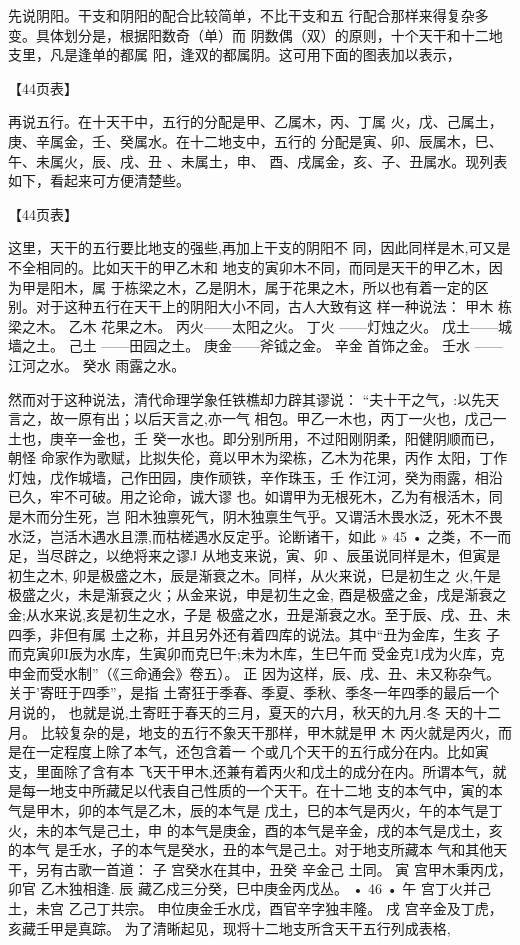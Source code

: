 先说阴阳。干支和阴阳的配合比较简单，不比干支和五
行配合那样来得复杂多变。具体划分是，根据阳数奇（单）而
阴数偶（双）的原则，十个天干和十二地支里，凡是逢单的都属
阳，逢双的都属阴。这可用下面的图表加以表示，

【44页表】

再说五行。在十天干中，五行的分配是甲、乙属木，丙、丁属
火，戊、己属土，庚、辛属金，壬、癸属水。在十二地支中，五行的
分配是寅、卯、辰属木，巳、午、未属火，辰、戌、丑 、未属土，申、
酉、戌属金，亥、子、丑属水。现列表如下，看起来可方便清楚些。

【44页表】

这里，天干的五行要比地支的强些,再加上干支的阴阳不
同，因此同样是木,可又是不全相同的。比如天干的甲乙木和
地支的寅卯木不同，而同是天干的甲乙木，因为甲是阳木，属
于栋梁之木，乙是阴木，属于花果之木，所以也有着一定的区
别。对于这种五行在天干上的阴阳大小不同，古人大致有这
样一种说法：
甲木 栋梁之木。
乙木 花果之木。
丙火——太阳之火。
丁火
——灯烛之火。
戊土——城墙之土。
己土
——田园之土。
庚金——斧钺之金。
辛金 首饰之金。
壬水
——江河之水。
癸水 雨露之水。

然而对于这种说法，清代命理学象任铁樵却力辟其谬说：
“夫十干之气，:以先天言之，故一原有出；以后天言之,亦一气
相包。甲乙一木也，丙丁一火也，戊己一土也，庚辛一金也，壬
癸一水也。即分别所用，不过阳刚阴柔，阳健阴顺而已，朝怪
命家作为歌赋，比拟失伦，竟以甲木为梁栋，乙木为花果，丙作
太阳，丁作灯烛，戊作城墙，己作田园，庚作顽铁，辛作珠玉，壬
作江河，癸为雨露，相沿已久，牢不可破。用之论命，诚大谬
也。如谓甲为无根死木，乙为有根活木，同是木而分生死，岂
阳木独禀死气，阴木独禀生气乎。又谓活木畏水泛，死木不畏
水泛，岂活木遇水且漂,而枯槎遇水反定乎。论断诸干，如此
» 45 •
之类，不一而足，当尽辟之，以绝将来之谬J
从地支来说，寅、卯 、辰虽说同样是木，但寅是初生之木,
卯是极盛之木，辰是渐衰之木。同样，从火来说，巳是初生之
火,午是极盛之火，未是渐衰之火；从金来说，申是初生之金,
酉是极盛之金，戌是渐衰之金;从水来说,亥是初生之水，子是
极盛之水，丑是渐衰之水。至于辰、戌、丑、未四季，非但有属
土之称，并且另外还有着四库的说法。其中“丑为金库，生亥
子而克寅卯I辰为水库，生寅卯而克巳午;未为木库，生巳午而
受金克1戌为火库，克申金而受水制”（《三命通会》卷五）。 正
因为这样，辰、戌、丑、未又称杂气。关于'寄旺于四季”，是指
土寄狂于季春、季夏、季秋、季冬一年四季的最后一个月说的，
也就是说,土寄旺于春天的三月，夏天的六月，秋天的九月.冬
天的十二月。
比较复杂的是，地支的五行不象天干那样，甲木就是甲
木 丙火就是丙火，而是在一定程度上除了本气，还包含着一
个或几个天干的五行成分在内。比如寅支，里面除了含有本
飞天干甲木,还兼有着丙火和戊土的成分在内。所谓本气，就
是每一地支中所藏足以代表自己性质的一个天干。在十二地
支的本气中，寅的本气是甲木，卯的本气是乙木，辰的本气是
戊土，巳的本气是丙火，午的本气是丁火，未的本气是己土，申
的本气是庚金，酉的本气是辛金，戌的本气是戊土，亥的本气
是壬水，子的本气是癸水，丑的本气是己土。对于地支所藏本
气和其他天干，另有古歌一首道：
子 宫癸水在其中，丑癸 辛金己 土同。
寅 宫甲木秉丙戊，卯官 乙木独相逢.
辰 藏乙戍三分癸，巳中庚金丙戊丛。
• 46 •
午 宫丁火并己土，未宫 乙己丁共宗。
申位庚金壬水戊，酉官辛字独丰隆。
戌 宫辛金及丁虎，亥藏壬甲是真踪。
为了清晰起见，现将十二地支所含天干五行列成表格,

